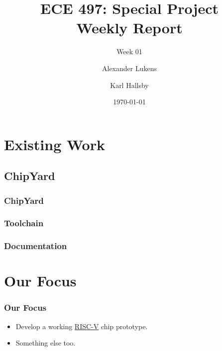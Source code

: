 \documentclass{weeklyslides}
\title[Weekly Report]{ECE 497: Special Project \\ Weekly Report}
\subtitle{Week 01}
\author{Alexander Lukens \and Karl Hallsby}
\institute{Illinois Institute of Technology}
\date{\today}
\begin{document}
\begin{frame}
  \titlepage{}
\end{frame}

\section{Existing Work}\label{sec:Existing Work}
\subsection{ChipYard}\label{subsec:ChipYard}
\begin{frame}
  \frametitle{ChipYard}
\end{frame}

\subsubsection{Toolchain}\label{subsubsec:Toolchain}
\begin{frame}
  \frametitle{}
\end{frame}

\subsubsection{Documentation}\label{subsubsec:Doc}
\begin{frame}
  \frametitle{}
\end{frame}


\section{Our Focus}\label{sec:Our_Focus}
\begin{frame}
  \frametitle{Our Focus}
  \begin{itemize}
  \item Develop a working \href{https://riscv.org/}{RISC-V} chip prototype.
  \item Something else too.
  \end{itemize}

\end{frame}
\end{document}

